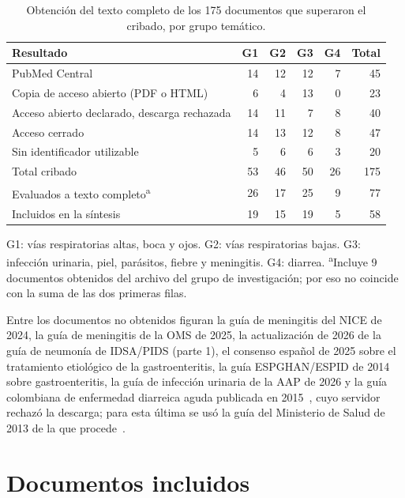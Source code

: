 \documentclass[10pt,a4paper]{article}
\begin{document}
\begin{table}[htbp]
\centering
\caption{Obtención del texto completo de los 175 documentos que superaron el cribado, por grupo temático.}
\small
\begin{tabular}{@{}lrrrrr@{}}
\toprule
Resultado & G1 & G2 & G3 & G4 & Total \\
\midrule
PubMed Central & 14 & 12 & 12 & 7 & 45 \\
Copia de acceso abierto (PDF o HTML) & 6 & 4 & 13 & 0 & 23 \\
Acceso abierto declarado, descarga rechazada & 14 & 11 & 7 & 8 & 40 \\
Acceso cerrado & 14 & 13 & 12 & 8 & 47 \\
Sin identificador utilizable & 5 & 6 & 6 & 3 & 20 \\
\midrule
Total cribado & 53 & 46 & 50 & 26 & 175 \\
Evaluados a texto completo\textsuperscript{a} & 26 & 17 & 25 & 9 & 77 \\
Incluidos en la síntesis & 19 & 15 & 19 & 5 & 58 \\
\bottomrule
\end{tabular}

\vspace{2pt}
\begin{minipage}{0.9\textwidth}\footnotesize
G1: vías respiratorias altas, boca y ojos. G2: vías respiratorias bajas. G3: infección urinaria, piel, parásitos, fiebre y meningitis. G4: diarrea. \textsuperscript{a}Incluye 9 documentos obtenidos del archivo del grupo de investigación; por eso no coincide con la suma de las dos primeras filas.
\end{minipage}
\end{table}

Entre los documentos no obtenidos figuran la guía de meningitis del NICE de 2024, la guía de meningitis de la OMS de 2025, la actualización de 2026 de la guía de neumonía de IDSA/PIDS (parte 1), el consenso español de 2025 sobre el tratamiento etiológico de la gastroenteritis, la guía ESPGHAN/ESPID de 2014 sobre gastroenteritis, la guía de infección urinaria de la AAP de 2026 y la guía colombiana de enfermedad diarreica aguda publicada en 2015~\citep{florez2015}, cuyo servidor rechazó la descarga; para esta última se usó la guía del Ministerio de Salud de 2013 de la que procede~\citep{gpc8}.

\section{Documentos incluidos}
\end{document}
